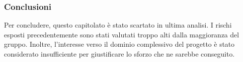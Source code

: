 \subsubsection{Conclusioni}
\label{conclusioni2}
Per concludere, questo capitolato è stato scartato in ultima analisi. I rischi esposti precedentemente sono stati valutati troppo alti dalla maggioranza del gruppo. Inoltre, l'interesse verso il dominio complessivo del progetto è stato considerato insufficiente per giustificare lo sforzo che ne sarebbe conseguito.